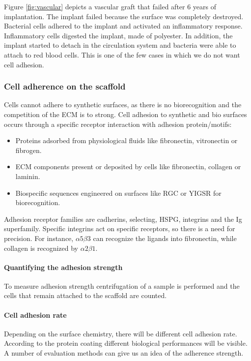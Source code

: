 			Figure \ref{fig:vascular} depicts a vascular graft that failed after 6 years of implantation.
			The implant failed because the surface was completely destroyed.
			Bacterial cells  adhered to the implant and activated an inflammatory response.
			Inflammatory cells digested the implant, made of polyester.
			In addition, the implant started to detach in the circulation system  and bacteria were able to attach to red blood cells.
			This is one of the few cases in which we do not want cell adhesion.

		\subsubsection{Cell adherence on the scaffold}
		Cells cannot adhere to synthetic surfaces, as there is no biorecognition and the competition of the ECM is to strong.
		Cell adhesion to synthetic and bio surfaces occurs through a specific receptor interaction with adhesion protein/motifs:

		\begin{multicols}{2}
			\begin{itemize}
				\item Proteins adsorbed from physiological fluids like fibronectin, vitronectin or fibrogen.
				\item ECM components present or deposited by cells like fibronectin, collagen or laminin.
				\item Biospecific sequences engineered on surfaces like RGC or YIGSR for biorecognition.
			\end{itemize}
		\end{multicols}

		Adhesion receptor families are cadherins, selecting, HSPG, integrins and the Ig superfamily.
		Specific integrins act on specific receptors, so there is a need for precision.
		For instance, $\alpha 5\beta 3$ can recognize the ligands into fibronectin, while collagen is recognized by $\alpha 2 \beta 1$.

			\paragraph{Quantifying the adhesion strength}
			To measure adhesion strength centrifugation of a sample is performed and the cells that remain attached to the scaffold are counted.

			\paragraph{Cell adhesion rate}
			Depending on the surface chemistry, there will be different cell adhesion rate.
			According to the protein coating different biological performances will be visible.
			A number of evaluation methods can give us an idea of the adherence strength.

